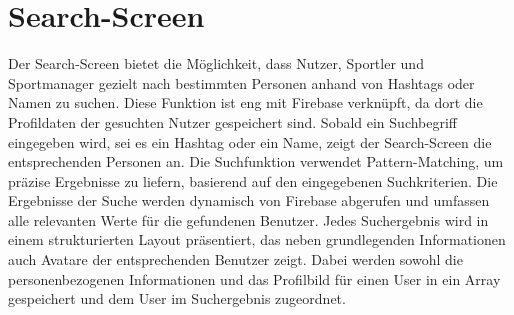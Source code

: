 \section{Search-Screen}
Der Search-Screen bietet die Möglichkeit, dass Nutzer, Sportler und Sportmanager gezielt nach bestimmten Personen anhand von Hashtags oder Namen zu suchen. 
Diese Funktion ist eng mit Firebase verknüpft, da dort die Profildaten der gesuchten Nutzer gespeichert sind.
Sobald ein Suchbegriff eingegeben wird, sei es ein Hashtag oder ein Name, zeigt der Search-Screen die entsprechenden Personen an.
Die Suchfunktion verwendet Pattern-Matching, um präzise Ergebnisse zu liefern, basierend auf den eingegebenen Suchkriterien.
Die Ergebnisse der Suche werden dynamisch von Firebase abgerufen und umfassen alle relevanten Werte für die gefundenen Benutzer.
Jedes Suchergebnis wird in einem strukturierten Layout präsentiert, das neben grundlegenden Informationen auch Avatare der entsprechenden Benutzer zeigt.
Dabei werden sowohl die personenbezogenen Informationen und das Profilbild für einen User in ein Array gespeichert und dem User im Suchergebnis zugeordnet.